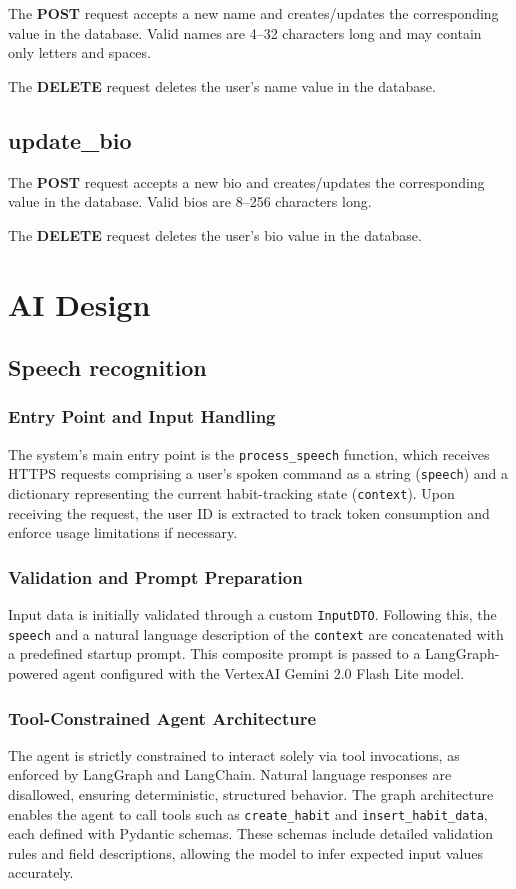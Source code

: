 \documentclass{article}
\newcommand{\newpar}[0]{\vspace{2mm}\noindent}
\begin{document}
The \textbf{POST} request accepts a new name and creates/updates the corresponding value in the database.
Valid names are 4–32 characters long and may contain only letters and spaces.

\newpar
The \textbf{DELETE} request deletes the user's name value in the database.

\subsection{update\_bio}

The \textbf{POST} request accepts a new bio and creates/updates the corresponding value in the database.
Valid bios are 8–256 characters long.

\newpar
The \textbf{DELETE} request deletes the user's bio value in the database.

\section{AI Design}

\subsection{Speech recognition}

\subsubsection{Entry Point and Input Handling}
The system's main entry point is the \texttt{process\_speech} function, which receives HTTPS requests comprising a user’s spoken command as a string (\texttt{speech}) and a dictionary representing the current habit-tracking state (\texttt{context}). Upon receiving the request, the user ID is extracted to track token consumption and enforce usage limitations if necessary.

\subsubsection{Validation and Prompt Preparation}
Input data is initially validated through a custom \texttt{InputDTO}. Following this, the \texttt{speech} and a natural language description of the \texttt{context} are concatenated with a predefined startup prompt. This composite prompt is passed to a LangGraph-powered agent configured with the VertexAI Gemini 2.0 Flash Lite model.

\subsubsection{Tool-Constrained Agent Architecture}
The agent is strictly constrained to interact solely via tool invocations, as enforced by LangGraph and LangChain. Natural language responses are disallowed, ensuring deterministic, structured behavior. The graph architecture enables the agent to call tools such as \texttt{create\_habit} and \texttt{insert\_habit\_data}, each defined with Pydantic schemas. These schemas include detailed validation rules and field descriptions, allowing the model to infer expected input values accurately.
\end{document}
